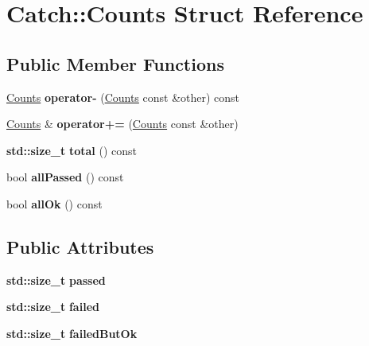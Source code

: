 \hypertarget{struct_catch_1_1_counts}{}\section{Catch\+:\+:Counts Struct Reference}
\label{struct_catch_1_1_counts}
\subsection*{Public Member Functions}
\begin{DoxyCompactItemize}
\item 
\mbox{\label{struct_catch_1_1_counts_aaa10666f559057e3e860d2a5a6fae4c4}} 
\hyperlink{struct_catch_1_1_counts}{Counts} {\bfseries operator-\/} (\hyperlink{struct_catch_1_1_counts}{Counts} const \&other) const
\item 
\mbox{\label{struct_catch_1_1_counts_a322a89475cd2cc039140ef371e973677}} 
\hyperlink{struct_catch_1_1_counts}{Counts} \& {\bfseries operator+=} (\hyperlink{struct_catch_1_1_counts}{Counts} const \&other)
\item 
\mbox{\label{struct_catch_1_1_counts_a94f969c09cf52d1339c085c9603cd1d3}} 
\textbf{ std\+::size\+\_\+t} {\bfseries total} () const
\item 
\mbox{\label{struct_catch_1_1_counts_a84999490e0ecaa3de5e121bf48eda1b3}} 
bool {\bfseries all\+Passed} () const
\item 
\mbox{\label{struct_catch_1_1_counts_a33bd996e016030155b99fe1c51c08991}} 
bool {\bfseries all\+Ok} () const
\end{DoxyCompactItemize}
\subsection*{Public Attributes}
\begin{DoxyCompactItemize}
\item 
\mbox{\label{struct_catch_1_1_counts_ad28daaf3de28006400208b6dd0c631e6}} 
\textbf{ std\+::size\+\_\+t} {\bfseries passed}
\item 
\mbox{\label{struct_catch_1_1_counts_a19982a3817a3bc2c07f0290e71f497a3}} 
\textbf{ std\+::size\+\_\+t} {\bfseries failed}
\item 
\mbox{\label{struct_catch_1_1_counts_ac090973a2ff51394cd452718e75c073e}} 
\textbf{ std\+::size\+\_\+t} {\bfseries failed\+But\+Ok}
\end{DoxyCompactItemize}


